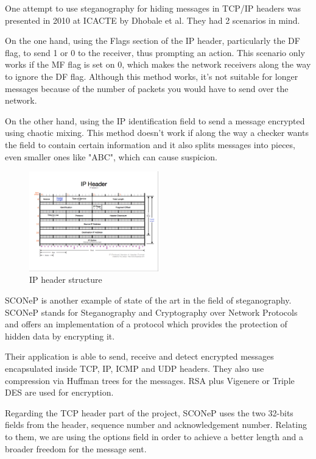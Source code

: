 
One attempt to use steganography for hiding messages in TCP/IP headers was
presented in 2010 at ICACTE by Dhobale et al\cite{stegano-hiding-data}. They had 2
scenarios in mind.

On the one hand, using the Flags section of the IP header, particularly the DF flag, to send
1 or 0 to the receiver, thus prompting an action. This scenario only works if
the MF flag is set on 0, which makes the network receivers along the way to
ignore the DF flag. Although this method works, it's not suitable for longer
messages because of the number of packets you would have to send over the
network.

On the other hand, using the IP identification field to send a message encrypted using chaotic
mixing. This method doesn't work if along the way a checker wants the field to
contain certain information and it also splits messages into pieces, even
smaller ones like "ABC", which can cause suspicion.

\begin{figure}
  \centering
  \includegraphics[width=0.5\textwidth]{img/IPHeader}
  \caption{IP header structure}
  \label{fig:related}
\end{figure}

SCONeP\cite{ciobanu2011sconep} is another example of state of the art in the
field of steganography. SCONeP stands for Steganography and Cryptography over
Network Protocols and offers an implementation of a protocol which provides
the protection of hidden data by encrypting it.

Their application is able to send, receive and detect encrypted messages
encapsulated inside TCP, IP, ICMP and UDP headers. They also use compression
via Huffman trees for the messages. RSA plus Vigenere or Triple DES are used
for encryption.

Regarding the TCP header part of the project, SCONeP uses the two 32-bits
fields from the header, sequence number and acknowledgement number. Relating
to them, we are using the options field in order to achieve a better length
and a broader freedom for the message sent.
